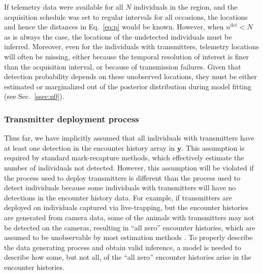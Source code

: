 \documentclass[12pt]{article}
\begin{document}
If telemetry data were available for all $N$ individuals in the
region, and the acquisition schedule was set to regular intervals for
all occasions, the locations and hence the distances in Eq.~\ref{eq:p}
would be known. However, when $n^{\mathrm det}<N$ as is always the case, the
locations of the undetected individuals must be inferred. Moreover,
even for the individuals with transmitters, telemetry locations will often
be missing, either because the temporal resolution of interest is
finer than the acquisition interval, or because of transmission
failures. Given that detection probability depends on these unobserved
locations, they must be either estimated or marginalized out of the posterior
distribution during model fitting (see Sec.~\ref{ssec:n0}).

\subsubsection{Transmitter deployment process}%
\label{ssec:tr-deploy}

Thus far, we have implicitly assumed that all 
individuals with transmitters have at least one detection in the encounter history
array in $\bm y$. This assumption is required by standard mark-recapture
methods, which effectively estimate the number of individuals not
detected. %
However, this assumption will be violated if
the process used to deploy transmitters is different than the process
used to detect individuals because some individuals with transmitters
will have no detections in the encounter history data. For example, if
transmitters are deployed on individuals captured via live-trapping,
but the encounter histories are generated from camera data, some of
the animals with transmitters may not be detected on the cameras,
resulting in ``all zero'' encounter histories, which are assumed to be
unobservable by most estimation methods \citep{williams_etal:2002}. To
properly describe the data generating process and obtain
valid inference, a model is needed to describe how some, but not all,
of the ``all zero'' encounter histories arise in the encounter
histories. 
\end{document}
